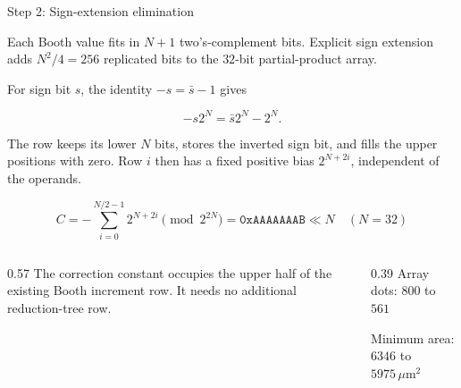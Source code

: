 \documentclass[aspectratio=169,11pt]{beamer}
\newcommand{\umarea}{\ensuremath{\,\mu\mathrm{m}^{2}}}
\begin{document}
\begin{frame}{Step 2: Sign-extension elimination}

Each Booth value fits in $N+1$ two's-complement bits. Explicit sign extension
adds $N^2/4=256$ replicated bits to the $32$-bit partial-product array.

\vspace{4pt}
For sign bit $s$, the identity $-s=\bar{s}-1$ gives

\[
-s2^N=\bar{s}2^N-2^N.
\]

The row keeps its lower $N$ bits, stores the inverted sign bit, and fills the
upper positions with zero. Row $i$ then has a fixed positive bias
$2^{N+2i}$, independent of the operands.

\[
C=-\sum_{i=0}^{N/2-1}2^{N+2i}\pmod{2^{2N}}
=\mathtt{0xAAAAAAAB}\ll N \quad (N=32)
\]

\begin{columns}[T]
\begin{column}{0.57\textwidth}
\small
The correction constant occupies the upper half of the existing Booth
increment row. It needs no additional reduction-tree row.
\end{column}
\begin{column}{0.39\textwidth}
\small
Array dots: $800$ to $561$\par
Minimum area: $6346$ to $5975\umarea$
\end{column}
\end{columns}

\end{frame}
\end{document}
